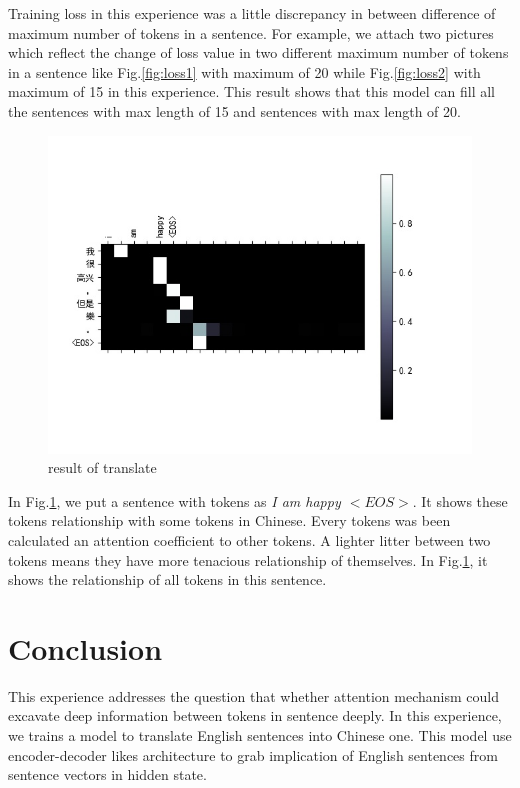 \documentclass[journal, a4paper]{IEEEtran}
\begin{document}
Training loss in this experience was a little discrepancy in between difference of maximum number of tokens in a sentence. For example, we attach two pictures which reflect the change of loss value in two different maximum number of tokens in a sentence like Fig.\ref{fig:loss1} with maximum of 20 while Fig.\ref{fig:loss2} with maximum of 15 in this experience. This result shows that this model can fill all the sentences with max length of 15 and sentences with max length of 20.

		\begin{figure}
		\begin{center}
		\includegraphics[width=\columnwidth]{images/result-i am happy.jpg}
		\caption{result of translate}
		\label{fig:result1}
		\end{center}
	\end{figure}

In Fig.\ref{fig:result1}, we put a sentence with tokens as \textit{I am happy $ <EOS> $}. It shows these tokens relationship with some tokens in Chinese. Every tokens was been calculated an attention coefficient to other tokens. A lighter litter between two tokens means they have more tenacious relationship of themselves. In Fig.\ref{fig:result1}, it shows the relationship of all tokens in this sentence.


\section{Conclusion}
	This experience addresses the question that whether attention mechanism could excavate deep information between tokens in sentence deeply. In this experience, we trains a model to translate English sentences into Chinese one. This model use encoder-decoder likes architecture to grab implication of English sentences from sentence vectors in hidden state.
\end{document}
